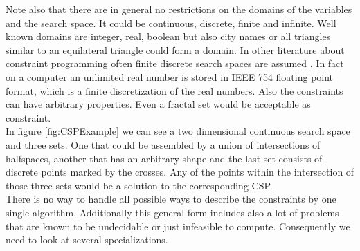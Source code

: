 Note also that there are in general no restrictions on the domains of the variables and the search space. It could be continuous, discrete, finite and infinite. Well known domains are integer, real, boolean but also city names or all triangles similar to an equilateral triangle could form a domain. In other literature about constraint programming often finite discrete search spaces are assumed \cite{Citation Needed}. In fact on a computer an unlimited real number is stored in IEEE 754 floating point format, which is a finite discretization of the real numbers. Also the constraints can have arbitrary properties. Even a fractal set would be acceptable as constraint.\\
In figure \ref{fig:CSPExample} we can see a two dimensional continuous search space and three sets. One that could be assembled by a union of intersections of halfspaces, another that has an arbitrary shape and the last set consists of discrete points marked by the crosses. Any of the points within the intersection of those three sets would be a solution to the corresponding CSP.\\
There is no way to handle all possible ways to describe the constraints by one single algorithm. Additionally this general form includes also a lot of problems that are known to be undecidable or just infeasible to compute. Consequently we need to look at several specializations.


